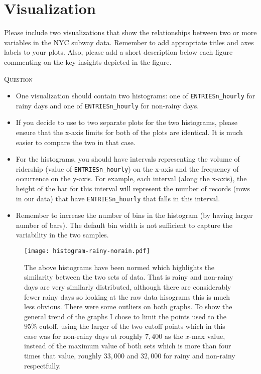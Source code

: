 \documentclass{article}
\newcounter{questionCtr}
\newenvironment{question}{%
   \bigskip\noindent%
   \refstepcounter{questionCtr}%
   \textsc{Question \thequestionCtr}%
   \newline%
   }{\par\bigskip}  %
\numberwithin{questionCtr}{section}
\numberwithin{problemCtr}{section}
\begin{document}
\section{Visualization}
Please include two visualizations that show the relationships between two or
more variables in the NYC subway data.
Remember to add appropriate titles and axes labels to your plots. Also, please
add a short description below each figure commenting on the key insights
depicted in the figure.

\begin{question}
\begin{itemize}
  \item One visualization should contain two histograms: one of
    \verb|ENTRIESn_hourly| for rainy days and one of \verb|ENTRIESn_hourly| for
    non-rainy days.
  \item If you decide to use to two separate plots for the two histograms,
    please ensure that the x-axis limits for both of the plots are identical. It
    is much easier to compare the two in that case.
  \item For the histograms, you should have intervals representing the volume of
    ridership (value of \verb|ENTRIESn_hourly|) on the x-axis and the frequency of
    occurrence on the y-axis. For example, each interval (along the x-axis), the
    height of the bar for this interval will represent the number of records
    (rows in our data) that have \verb|ENTRIESn_hourly| that falls in this interval.
  \item Remember to increase the number of bins in the histogram (by having
    larger number of bars). The default bin width is not sufficient to capture
    the variability in the two samples.
\end{itemize}
\end{question}

\begin{figure}[ht]
  \centering
  \texttt{[image: histogram-rainy-norain.pdf]}
  \caption{The above histograms have been normed which highlights the similarity
    between the two sets of data.  That is rainy and non-rainy days are very
    similarly distributed, although there are considerably fewer rainy days so
    looking at the raw data hisograms this is much less obvious.  There were
    some outliers on both graphs.  To show the general trend of the graphs I
    chose to limit the points used to the $95\%$ cutoff, using the larger of the
    two cutoff points which in this case was for non-rainy days at roughly
  $7,400$ as the $x$-max value, instead of the maximum value of both sets which
is more than four times that value, roughly $33,000$ and $32,000$ for rainy and
non-rainy respectfully.}
\label{fig:histo-entries_hourly}
\end{figure}
\end{document}
